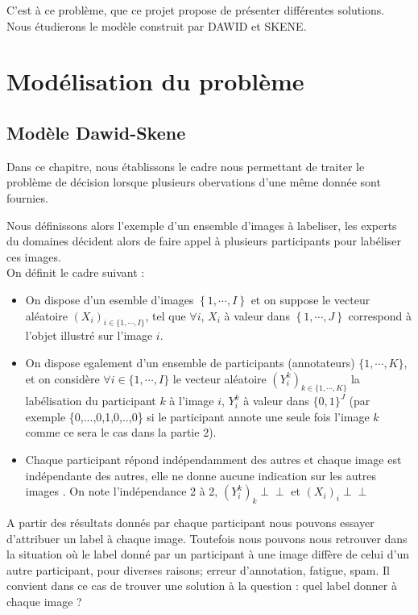 \documentclass[frenchb]{report}
\newcommand{\1}{\mathbbm{1}}
\newcommand{\indep}{\perp \!\!\! \perp}
\theoremstyle{definition}\newtheorem{defn}{Définition}
\theoremstyle{definition}\newtheorem{exm}{Exemple}
\theoremstyle{definition}\newtheorem{nota}{Notation}
\theoremstyle{definition}\newtheorem{rem}{Remarque}
\begin{document}
C'est à ce problème, que ce projet propose de présenter différentes solutions. Nous étudierons le modèle construit par DAWID et SKENE.


\newpage

\chapter{Modélisation du problème}

\section{Modèle Dawid-Skene}

Dans ce chapitre, nous établissons le cadre nous permettant de traiter le problème de décision lorsque plusieurs obervations d'une même donnée sont fournies. 

Nous définissons alors l'exemple d'un ensemble d'images à labeliser, les experts du domaines décident alors de faire appel à plusieurs participants pour labéliser ces images.\\
On définit le cadre suivant : 

\begin{itemize}[label=\adfflowerleft]
	\item On dispose d'un esemble d'images $\left\{1,\cdots,I\right\}$ et on suppose le vecteur aléatoire $(X_i)_{i \in \{1,\cdots,I \}}$, tel que $\forall i$, $X_i$ à valeur dans $\left\{1,\cdots,J\right\}$ correspond à l'objet illustré sur l'image $i$.
	\item On dispose egalement d'un ensemble de participants (annotateurs) $\{1, \cdots, K\}$, et on considère $\forall i \in \{1, \cdots, I\}$ le vecteur aléatoire $(Y^k_i)_{k \in \{1, \cdots, K\}}$ la labélisation du participant $k$ à l'image $i$, $Y^k_i$ à valeur dans $\{0,1\}^J$ (par exemple \{0,...,0,1,0,..,0\} si le participant annote une seule fois l'image $k$ comme ce sera le cas dans la partie 2). 
	\item Chaque participant répond indépendamment des autres et chaque image est indépendante des autres, elle ne donne aucune indication sur les autres images . On note l'indépendance 2 à 2, $(Y^k_i)_k \indep$ et $(X_i)_i \indep$
\end{itemize}

A partir des résultats donnés par chaque participant nous pouvons essayer d'attribuer un label à chaque image. Toutefois nous pouvons nous retrouver dans la situation où le label donné par un participant à une image diffère de celui d'un autre participant, pour diverses raisons; erreur d'annotation, fatigue, spam. Il convient dans ce cas de trouver une solution à la question : quel label donner à chaque image ? \\
\end{document}
